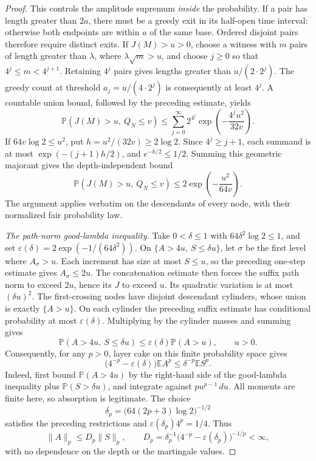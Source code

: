 \documentclass[11pt]{article}
\numberwithin{equation}{section}
\theoremstyle{remark}
\theoremstyle{definition}
\begin{document}
\begin{proof}
This controls the amplitude supremum \emph{inside} the probability.
If a pair has length greater than $2a$, there must be a greedy exit
in its half-open time interval: otherwise both endpoints are within
$a$ of the same base. Ordered disjoint pairs therefore require
distinct exits. If $J(M)>u>0$, choose a witness with $m$ pairs of
length greater than $\lambda$, where $\lambda\sqrt m>u$, and choose
$j\ge0$ so that $4^j\le m<4^{j+1}$. Retaining $4^j$ pairs gives
lengths greater than $u/(2\cdot2^j)$. The greedy count at threshold
$a_j=u/(4\cdot2^j)$ is consequently at least $4^j$. A countable
union bound, followed by the preceding estimate, yields
\[
 \mathbb P(J(M)>u,\ Q_N\le v)
 \le\sum_{j=0}^\infty
       2^{4^j}\exp\left(-\frac{4^ju^2}{32v}\right).
\]
If $64v\log2\le u^2$, put $h=u^2/(32v)\ge2\log2$.
Since $4^j\ge j+1$, each summand is at most
$\exp(-(j+1)h/2)$, and $e^{-h/2}\le1/2$. Summing this geometric
majorant gives the depth-independent bound
\[
 \mathbb P(J(M)>u,\ Q_N\le v)
 \le2\exp\left(-\frac{u^2}{64v}\right).
\]
The argument applies verbatim on the descendants of every node,
with their normalized fair probability law.

\emph{The path-norm good-lambda inequality.}
Take $0<\delta\le1$ with $64\delta^2\log2\le1$, and set
$\varepsilon(\delta)=2\exp(-1/(64\delta^2))$.
On $\{A>4u,\ S\le\delta u\}$, let $\sigma$ be the first level
where $A_\sigma>u$. Each increment has size at most $S\le u$,
so the preceding one-step estimate gives $A_\sigma\le2u$.
The concatenation estimate then forces the suffix path norm to
exceed $2u$, hence its $J$ to exceed $u$. Its quadratic variation
is at most $(\delta u)^2$. The first-crossing nodes have disjoint
descendant cylinders, whose union is exactly $\{A>u\}$.
On each cylinder the preceding suffix estimate has conditional
probability at most $\varepsilon(\delta)$. Multiplying by the
cylinder masses and summing gives
\[
 \mathbb P(A>4u,\ S\le\delta u)
 \le\varepsilon(\delta)\mathbb P(A>u),\qquad u>0.
\]
Consequently, for any $p>0$, layer cake on this finite probability
space gives
\[
 \bigl(4^{-p}-\varepsilon(\delta)\bigr)\mathbb E A^p
 \le\delta^{-p}\mathbb E S^p.
\]
Indeed, first bound $\mathbb P(A>4u)$ by the right-hand side of
the good-lambda inequality plus $\mathbb P(S>\delta u)$, and
integrate against $pu^{p-1}\,du$. All moments are finite here,
so absorption is legitimate. The choice
\[
 \delta_p=\bigl(64(2p+3)\log2\bigr)^{-1/2}
\]
satisfies the preceding restrictions and
$\varepsilon(\delta_p)4^p=1/4$. Thus
\[
 \|A\|_p\le D_p\|S\|_p,\qquad
 D_p=\delta_p^{-1}
       \bigl(4^{-p}-\varepsilon(\delta_p)\bigr)^{-1/p}<\infty,
\]
with no dependence on the depth or the martingale values.


\end{proof}
\end{document}
